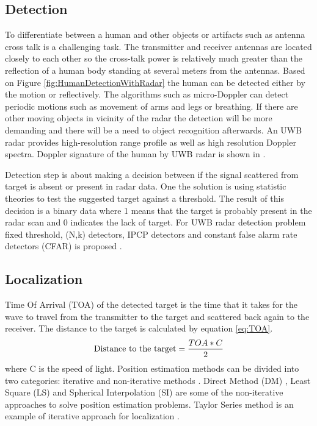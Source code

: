 \subsection{Detection}
To differentiate between a human and other objects or artifacts such as antenna cross talk is a challenging task. The transmitter and receiver antennas are located closely to each other so the cross-talk power is relatively much greater than the reflection of a human body standing at several meters from the antennas. Based on Figure \ref{fig:HumanDetectionWithRadar} the human can be detected either by the motion or reflectively. The algorithms such as micro-Doppler can detect periodic motions such as movement of arms and legs or breathing. If there are other moving objects in vicinity of the radar the detection will be more demanding and there will be a need to object recognition afterwards.
An UWB radar provides high-resolution range profile as well as high resolution Doppler spectra. Doppler signature of the human by UWB radar is shown in \cite{WangUWBDopplerPhD}.

Detection step is about making a decision between if the signal scattered from target is absent or present in radar data. One the solution is using statistic theories to test the suggested target against a threshold. The result of this decision is a binary data where 1 means that the target is probably present in the radar scan and 0 indicates the lack of target. For UWB radar detection problem fixed threshold, (N,k) detectors, IPCP detectors and constant false alarm rate detectors (CFAR) is proposed \cite{TayloUWBTech}.

\subsection{Localization}
Time Of Arrival (TOA) of the detected target is the time that it takes for the wave to travel from the transmitter to the target and scattered back again to the receiver. The distance to the target is calculated by equation \ref{eq:TOA}.
\begin{equation}
\label{eq:TOA}
	\textnormal{Distance to the target} = \frac{TOA * C}{2}
\end{equation}
where C is the speed of light.
Position estimation methods can be divided into two categories: iterative and non-iterative methods \cite{Shen2006}. Direct Method (DM) \cite{KegenYu}, Least Square (LS) \cite{YitengHuang2001} and Spherical Interpolation (SI) \cite{Schau1987} are some of the non-iterative approaches to solve position estimation problems. Taylor Series method is an example of iterative approach for localization \cite{FOY1976}.

